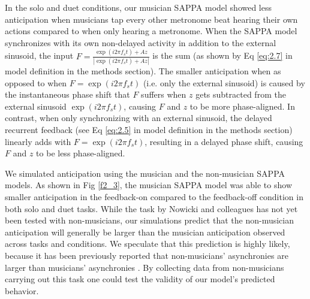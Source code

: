 \documentclass{report}
\begin{document}
In the solo and duet conditions, our musician SAPPA model showed less anticipation when musicians tap every other metronome beat hearing their own actions compared to when only hearing a metronome. When the SAPPA model synchronizes with its own non-delayed activity in addition to the external sinusoid, the input $F = \frac{\exp(i2\pi f_s t)+Az}{|\exp(i2\pi f_s t)+Az|}$ is the sum (as shown by Eq \eqref{eq:2.7} in model definition in the methods section). The smaller anticipation when as opposed to when $F = \exp(i2\pi f_s t)$ (i.e. only the external sinusoid) is caused by the instantaneous phase shift that $F$ suffers when $z$ gets subtracted from the external sinusoid $\exp(i2\pi f_s t)$, causing $F$ and $z$ to be more phase-aligned. In contrast, when only synchronizing with an external sinusoid, the delayed recurrent feedback (see Eq \eqref{eq:2.5} in model definition in the methods section) linearly adds with $F = \exp(i2\pi f_s t)$, resulting in a delayed phase shift, causing $F$ and $z$ to be less phase-aligned.

We simulated anticipation using the musician and the non-musician SAPPA models. As shown in Fig \ref{f2_3}, the musician SAPPA model was able to show smaller anticipation in the feedback-on compared to the feedback-off condition in both solo and duet tasks. While the task by Nowicki and colleagues \cite{nowicki2013mutual} has not yet been tested with non-musicians, our simulations predict that the non-musician anticipation will generally be larger than the musician anticipation observed across tasks and conditions. We speculate that this prediction is highly likely, because it has been previously reported that non-musicians’ asynchronies are larger than musicians’ asynchronies \cite{repp2007tapping}. By collecting data from non-musicians carrying out this task one could test the validity of our model’s predicted behavior.
\end{document}
